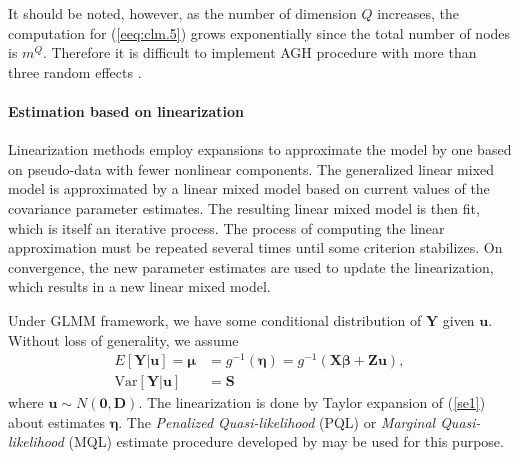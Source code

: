 		It should be noted, however, as the number of dimension $Q$ increases, the computation for (\ref{eeq:clm.5}) grows exponentially since the total number of nodes is $m^Q$.  Therefore it is difficult to implement AGH procedure with more than three random effects \citep{bolker2009generalized}.

		
		\paragraph{Estimation based on linearization}
		
		Linearization methods employ expansions to approximate the model by one based on pseudo-data with fewer nonlinear components. The generalized linear mixed model is approximated by a linear mixed model based on current values of the covariance parameter estimates. The resulting linear mixed model is then fit, which is itself an iterative process. The process of computing the linear approximation must be repeated several times until some criterion stabilizes.  On convergence, the new parameter estimates are used to update the linearization, which results in a new linear mixed model. 
		
		Under GLMM framework, we have some conditional distribution of $\bm Y$ given $\bm u$. Without loss of generality, we assume
		\begin{equation}\label{se1}
		\begin{aligned}
		E[\bm Y|\bm u] = \bm \mu &= g^{-1}(\bm \eta) = g^{-1}(\bm{X\beta} + \bm {Zu}), \\
		\text{Var}[\bm Y|\bm u]  & = \bm S
		\end{aligned}
		\end{equation}
		where $\bm u \sim N(\bm 0, \bm D)$.  The linearization  is done by Taylor expansion of (\ref{se1}) about estimates $\bm \eta$. The \textit{Penalized Quasi-likelihood } (PQL) or \textit{Marginal Quasi-likelihood} (MQL) estimate procedure developed by \cite{breslow1993approximate} may be used for this purpose. 
		
